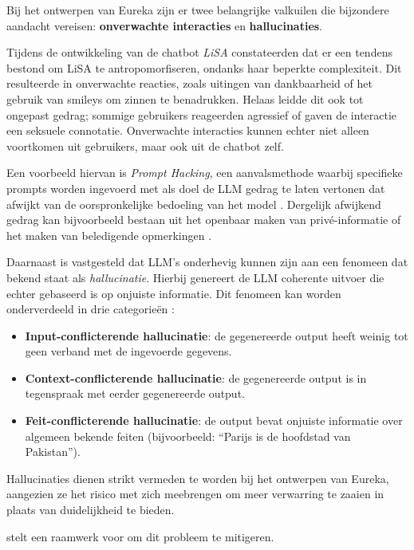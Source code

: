 Bij het ontwerpen van Eureka zijn er twee belangrijke valkuilen die bijzondere aandacht vereisen: \textbf{onverwachte interacties} en \textbf{hallucinaties}.

Tijdens de ontwikkeling van de chatbot \emph{LiSA} constateerden \textcite{Dibitonto2018} dat er een tendens bestond om LiSA te antropomorfiseren, ondanks haar beperkte complexiteit. Dit resulteerde in onverwachte reacties, zoals uitingen van dankbaarheid of het gebruik van smileys om zinnen te benadrukken. Helaas leidde dit ook tot ongepast gedrag; sommige gebruikers reageerden agressief of gaven de interactie een seksuele connotatie. Onverwachte interacties kunnen echter niet alleen voortkomen uit gebruikers, maar ook uit de chatbot zelf.

Een voorbeeld hiervan is \emph{Prompt Hacking}, een aanvalsmethode waarbij specifieke prompts worden ingevoerd met als doel de LLM gedrag te laten vertonen dat afwijkt van de oorspronkelijke bedoeling van het model \autocite{Rababah2024}. Dergelijk afwijkend gedrag kan bijvoorbeeld bestaan uit het openbaar maken van privé-informatie of het maken van beledigende opmerkingen \autocite{Naveed2023}.

Daarnaast is vastgesteld dat LLM's onderhevig kunnen zijn aan een fenomeen dat bekend staat als \emph{hallucinatie}. Hierbij genereert de LLM coherente uitvoer die echter gebaseerd is op onjuiste informatie. Dit fenomeen kan worden onderverdeeld in drie categorieën \autocite{Naveed2023}:

\begin{itemize} 
    \item \textbf{Input-conflicterende hallucinatie}: de gegenereerde output heeft weinig tot geen verband met de ingevoerde gegevens. 
    \item \textbf{Context-conflicterende hallucinatie}: de gegenereerde output is in tegenspraak met eerder gegenereerde output. 
    \item \textbf{Feit-conflicterende hallucinatie}: de output bevat onjuiste informatie over algemeen bekende feiten (bijvoorbeeld: ``Parijs is de hoofdstad van Pakistan''). 
\end{itemize}

Hallucinaties dienen strikt vermeden te worden bij het ontwerpen van Eureka, aangezien ze het risico met zich meebrengen om meer verwarring te zaaien in plaats van duidelijkheid te bieden.

\textcite{Taneja2024} stelt een raamwerk voor om dit probleem te mitigeren.

